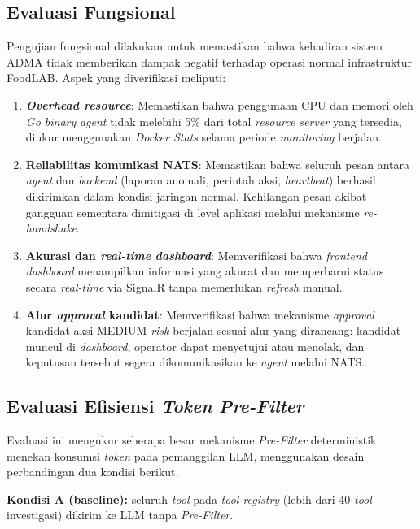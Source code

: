 \subsection{Evaluasi Fungsional}

Pengujian fungsional dilakukan untuk memastikan bahwa kehadiran sistem ADMA tidak memberikan dampak negatif terhadap operasi normal infrastruktur FoodLAB. Aspek yang diverifikasi meliputi:

\begin{enumerate}[label=\arabic*., leftmargin=*]
  \item \textbf{\textit{Overhead resource}}: Memastikan bahwa penggunaan CPU dan memori oleh \textit{Go binary} \textit{agent} tidak melebihi 5\% dari total \textit{resource server} yang tersedia, diukur menggunakan \textit{Docker Stats} selama periode \textit{monitoring} berjalan.
  \item \textbf{Reliabilitas komunikasi NATS}: Memastikan bahwa seluruh pesan antara \textit{agent} dan \textit{backend} (laporan anomali, perintah aksi, \textit{heartbeat}) berhasil dikirimkan dalam kondisi jaringan normal. Kehilangan pesan akibat gangguan sementara dimitigasi di level aplikasi melalui mekanisme \textit{re-handshake}.
  \item \textbf{Akurasi dan \textit{real-time} \textit{dashboard}}: Memverifikasi bahwa \textit{frontend dashboard} menampilkan informasi yang akurat dan memperbarui status secara \textit{real-time} via SignalR tanpa memerlukan \textit{refresh} manual.
  \item \textbf{Alur \textit{approval} kandidat}: Memverifikasi bahwa mekanisme \textit{approval} kandidat aksi MEDIUM \textit{risk} berjalan sesuai alur yang dirancang: kandidat muncul di \textit{dashboard}, operator dapat menyetujui atau menolak, dan keputusan tersebut segera dikomunikasikan ke \textit{agent} melalui NATS.
\end{enumerate}

\subsection{Evaluasi Efisiensi \textit{Token} \textit{Pre-Filter}}

Evaluasi ini mengukur seberapa besar mekanisme \textit{Pre-Filter} deterministik menekan konsumsi \textit{token} pada pemanggilan LLM, menggunakan desain perbandingan dua kondisi berikut.

\textbf{Kondisi A (baseline):} seluruh \textit{tool} pada \textit{tool registry} (lebih dari 40 \textit{tool} investigasi) dikirim ke LLM tanpa \textit{Pre-Filter}.

